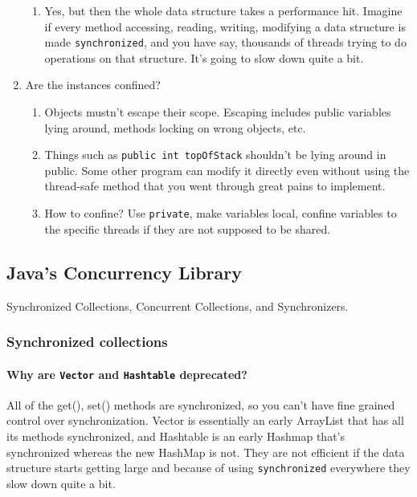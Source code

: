 \documentclass{article}
\begin{document}
\begin{enumerate}
\begin{enumerate}
            \item Yes, but then the whole data structure takes a performance hit. Imagine if every method accessing, reading, writing, modifying a data structure is made \lstinline{synchronized}, and you have say, thousands of threads trying to do operations on that structure. It's going to slow down quite a bit.
        \end{enumerate}
    \item Are the instances confined?
        \begin{enumerate}
            \item Objects mustn't escape their scope. Escaping includes public variables lying around, methods locking on wrong objects, etc.
            \item Things such as \lstinline{public int topOfStack} shouldn't be lying around in public. Some other program can modify it directly even without using the thread-safe method that you went through great pains to implement.
            \item How to confine? Use \lstinline{private}, make variables local, confine variables to the specific threads if they are not supposed to be shared.
        \end{enumerate}
\end{enumerate}

\subsection{Java's Concurrency Library}
Synchronized Collections, Concurrent Collections, and Synchronizers.

\subsubsection{Synchronized collections}
\paragraph{Why are \lstinline{Vector} and \lstinline{Hashtable} deprecated?} All of the get(), set() methods are synchronized, so you can't have fine grained control over synchronization. Vector is essentially an early ArrayList that has all its methods synchronized, and Hashtable is an early Hashmap that's synchronized whereas the new HashMap is not. They are not efficient if the data structure starts getting large and because of using \lstinline{synchronized} everywhere they slow down quite a bit.
\end{document}
